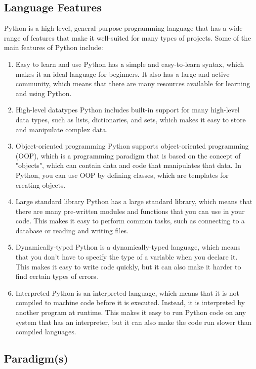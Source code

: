 \documentclass{article}
\begin{document}
\subsection*{Language Features}
Python is a high-level, general-purpose programming language that has a wide range of features that make it well-suited for many types of projects. Some of the main features of Python include:
\begin{enumerate}
  \item Easy to learn and use
    \subitem Python has a simple and easy-to-learn syntax, which makes it an ideal language for beginners. It also has a large and active community, which means that there are many resources available for learning and using Python.
  \item High-level datatypes 
    \subitem Python includes built-in support for many high-level data types, such as lists, dictionaries, and sets, which makes it easy to store and manipulate complex data.
  \item Object-oriented programming
    \subitem Python supports object-oriented programming (OOP), which is a programming paradigm that is based on the concept of "objects", which can contain data and code that manipulates that data. In Python, you can use OOP by defining classes, which are templates for creating objects.
  \item Large standard library
    \subitem Python has a large standard library, which means that there are many pre-written modules and functions that you can use in your code. This makes it easy to perform common tasks, such as connecting to a database or reading and writing files.
  \item Dynamically-typed 
    \subitem Python is a dynamically-typed language, which means that you don't have to specify the type of a variable when you declare it. This makes it easy to write code quickly, but it can also make it harder to find certain types of errors.
  \item Interpreted
    \subitem Python is an interpreted language, which means that it is not compiled to machine code before it is executed. Instead, it is interpreted by another program at runtime. This makes it easy to run Python code on any system that has an interpreter, but it can also make the code run slower than compiled languages.
\end{enumerate}

\subsection*{Paradigm(s)}
\end{document}
